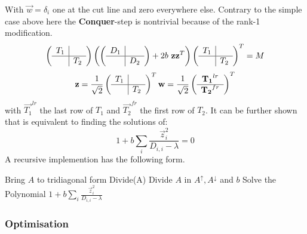 \documentclass[Master]{subfiles}
\begin{document}
With $\vec{w} = \delta_i$ one at the cut line and zero everywhere else.
Contrary to the simple case above here the \textbf{Conquer}-step is nontrivial because of the rank-1 modification.
$$
\left(\begin{array}{c|c}
    T_1 &  \\
    \hline
     & T_2
\end{array}\right)\left(
\left(\begin{array}{c|c}
    D_1 &  \\
    \hline
    & D_2
\end{array}\right)
+ 2b \ \vec{z}\vec{z}^T\right)
\left(\begin{array}{c|c}
    T_1 &  \\
    \hline
     & T_2
\end{array}\right)^T
= M
$$
$$
\vec{z}= \frac{1}{\sqrt{2}}\left(\begin{array}{c|c}
    T_1 &  \\
    \hline
    & T_2
\end{array}\right)^T \vec{w} = \frac{1}{\sqrt{2}}\left(\begin{array}{c}
    \vec{T_1}^{lr}  \\
    \hline
     \vec{T_2}^{fr}
\end{array}\right)^T
$$
with $\vec{T_1}^{lr}$ the last row of $T_1$ and $\vec{T_2}^{fr}$ the first row of $T_2$.
It can be further shown \cite{cuppen1980divide} that  is equivalent to finding the solutions of:
$$1 + b \sum_{i} \frac{\vec{z}_i ^2}{D_{i,i} - \lambda} = 0$$
A recursive implemention has the following form.
\begin{algorithm}
\caption{Divide and Conquer}\label{num:DivNConq}
\begin{algorithmic}[1]
\State Bring $A$ to tridiagonal form
\State Divide(A)
 
\State Divide $A$ in $A^{\uparrow},A^{\downarrow}$ and $b$ 
\State {} 
\Else {}
\State {}
\EndIf
\EndProcedure
{}
\State Solve the Polynomial $1 + b\sum_{i} \frac{\vec{z}_i ^2}{D_{i,i} - \lambda}$ 
\EndProcedure
\end{algorithmic}
\end{algorithm}
\subsubsection{Optimisation}
\end{document}
